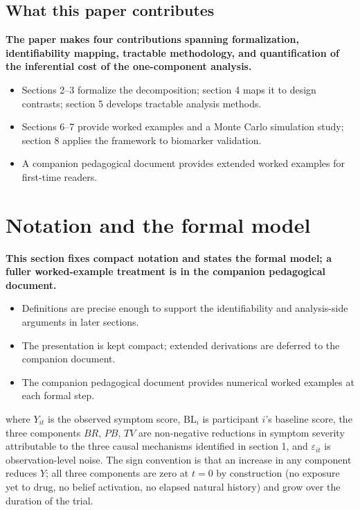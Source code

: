 \documentclass[
  11pt,
]{article}
\begin{document}
\subsection{What this paper contributes}\label{what-this-paper-contributes}

\textbf{The paper makes four contributions spanning formalization, identifiability mapping, tractable methodology, and quantification of the inferential cost of the one-component analysis.}

\begin{itemize}\setlength{\itemsep}{2pt}\setlength{\parskip}{0pt}
\item Sections 2--3 formalize the decomposition; section 4 maps it to design contrasts; section 5 develops tractable analysis methods.
\item Sections 6--7 provide worked examples and a Monte Carlo simulation study; section 8 applies the framework to biomarker validation.
\item A companion pedagogical document provides extended worked examples for first-time readers.
\end{itemize}

\section{Notation and the formal model}\label{notation-and-the-formal-model}

\textbf{This section fixes compact notation and states the formal model; a fuller worked-example treatment is in the companion pedagogical document.}

\begin{itemize}\setlength{\itemsep}{2pt}\setlength{\parskip}{0pt}
\item Definitions are precise enough to support the identifiability and analysis-side arguments in later sections.
\item The presentation is kept compact; extended derivations are deferred to the companion document.
\item The companion pedagogical document provides numerical worked examples at each formal step.
\end{itemize}

where \(Y_{it}\) is the observed symptom score, \(\mathrm{BL}_i\)
is participant \(i\)'s baseline score, the three components \(BR\),
\(PB\), \(TV\) are non-negative reductions in symptom severity
attributable to the three causal mechanisms identified in
section 1, and \(\varepsilon_{it}\) is observation-level noise.
The sign convention is that an increase in any component reduces
\(Y\); all three components are zero at \(t = 0\) by construction
(no exposure yet to drug, no belief activation, no elapsed
natural history) and grow over the duration of the trial.
\end{document}
